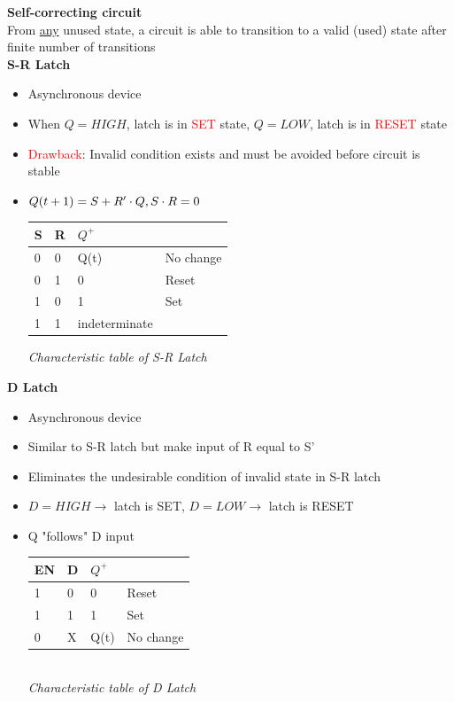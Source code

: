 \documentclass[a4paper]{article} \usepackage[backend=biber, style=numeric, sorting=none]{biblatex}
\begin{document}
\begin{multicols*}{4}
\textbf{Self-correcting circuit\\}
From \underline{any} unused state, a circuit is able to transition to a valid (used) state after finite number of transitions\\

\textbf{S-R Latch}
\begin{itemize}
    \item Asynchronous device
    \item When $Q=HIGH$, latch is in \textcolor{red}{SET} state, $Q=LOW$, latch is in \textcolor{red}{RESET} state
    \item \textcolor{red}{Drawback}: Invalid condition exists and must be avoided before circuit is stable
    \item $Q(t+1)=S+R'\cdot Q, \\S\cdot R = 0$
    \begin{center}
    \begin{tabular}{ll|ll}
    S & R & $Q^+$         &           \\ \hline
    0 & 0 & Q(t)          & No change \\
    0 & 1 & 0             & Reset     \\
    1 & 0 & 1             & Set       \\
    1 & 1 & indeterminate &
    \end{tabular}
    \textit{Characteristic table of S-R Latch}
    \end{center}
\end{itemize}
\textbf{D Latch}
\begin{itemize}
    \item Asynchronous device
    \item Similar to S-R latch but make input of R equal to S'
    \item Eliminates the undesirable condition of invalid state in S-R latch
    \item $D=HIGH \rightarrow$ latch is SET, $D=LOW \rightarrow$ latch is RESET
    \item Q "follows" D input
    \begin{center}
    \begin{tabular}{ll|ll}
    EN & D & $Q^+$ &           \\ \hline
    1  & 0 & 0     & Reset     \\
    1  & 1 & 1     & Set       \\
    0  & X & Q(t)  & No change
    \end{tabular}
    \textit{\\Characteristic table of D Latch}

\end{center}
\end{itemize}
\end{multicols*}
\end{document}
